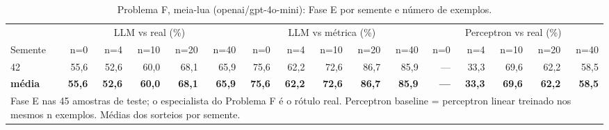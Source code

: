 \begin{table}[htbp]
\centering
\footnotesize
\caption{Problema F, meia-lua (openai/gpt-4o-mini): Fase E por semente e número de exemplos.}
\label{tab:bloco2_F_meialua_faseE_nshot_gpt4mini}
\begin{tabular}{lrrrrrrrrrrrrrrr}
\toprule
 & \multicolumn{5}{c}{LLM vs real (\%)} & \multicolumn{5}{c}{LLM vs métrica (\%)} & \multicolumn{5}{c}{Perceptron vs real (\%)} \\ \cmidrule(lr){2-6} \cmidrule(lr){7-11} \cmidrule(lr){12-16}
Semente & n=0 & n=4 & n=10 & n=20 & n=40 & n=0 & n=4 & n=10 & n=20 & n=40 & n=0 & n=4 & n=10 & n=20 & n=40 \\
\midrule
42 & 55,6 & 52,6 & 60,0 & 68,1 & 65,9 & 75,6 & 62,2 & 72,6 & 86,7 & 85,9 & — & 33,3 & 69,6 & 62,2 & 58,5 \\
\midrule
\textbf{média} & \textbf{55,6} & \textbf{52,6} & \textbf{60,0} & \textbf{68,1} & \textbf{65,9} & \textbf{75,6} & \textbf{62,2} & \textbf{72,6} & \textbf{86,7} & \textbf{85,9} & \textbf{—} & \textbf{33,3} & \textbf{69,6} & \textbf{62,2} & \textbf{58,5} \\
\bottomrule
\multicolumn{16}{p{0.95\linewidth}}{\footnotesize Fase E nas 45 amostras de teste; o especialista do Problema F é o rótulo real. Perceptron baseline = perceptron linear treinado nos mesmos n exemplos. Médias dos sorteios por semente.} \\
\end{tabular}
\end{table}
